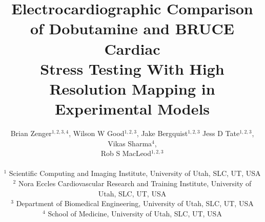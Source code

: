 \documentclass[twocolumn]{cinc}
\begin{document}
\title{Electrocardiographic Comparison of Dobutamine and BRUCE Cardiac \\ Stress Testing With High Resolution Mapping in Experimental Models}


\author { Brian Zenger$^{1,2,3,4}$, Wilson W Good$^{1,2,3}$, Jake Bergquist$^{1,2,3}$ Jess D Tate$^{1,2,3}$, Vikas Sharma$^{4}$, \\Rob S MacLeod$^{1,2,3}$\\
\ \\ %
$^1$ Scientific Computing and Imaging Institute, University of Utah, SLC, UT, USA \\
$^2$  Nora Eccles Cardiovascular Research and Training Institute, University of Utah, SLC, UT, USA \\
$^3$ Department of Biomedical Engineering, University of Utah, SLC, UT, USA \\
$^4$ School of Medicine, University of Utah, SLC, UT, USA }
\end{document}
